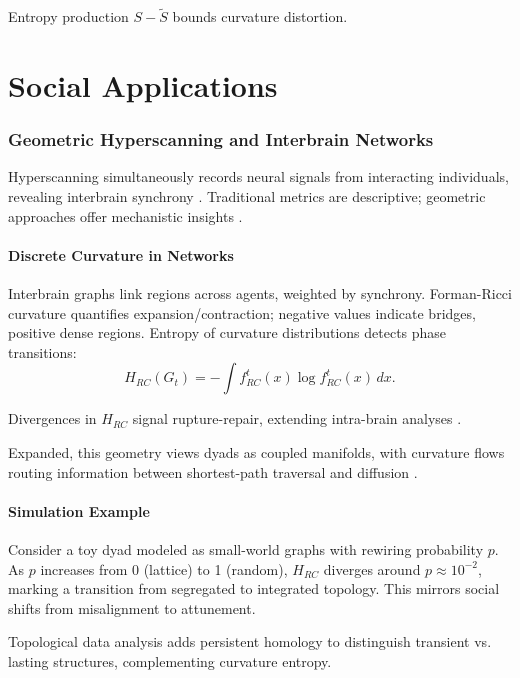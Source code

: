 \documentclass{article}
\theoremstyle{definition}
\begin{document}
Entropy production $S - \tilde{S}$ bounds curvature distortion.

\part{Social Applications}

\section{Geometric Hyperscanning and Interbrain Networks}

Hyperscanning simultaneously records neural signals from interacting individuals, revealing interbrain synchrony \cite{montague2002hyperscanning}. Traditional metrics are descriptive; geometric approaches offer mechanistic insights \cite{hinrichs2025geometry}.

\subsection{Discrete Curvature in Networks}

Interbrain graphs link regions across agents, weighted by synchrony. Forman-Ricci curvature quantifies expansion/contraction; negative values indicate bridges, positive dense regions. Entropy of curvature distributions detects phase transitions:
\[
H_{RC}(G_t) = -\int f^t_{RC}(x) \log f^t_{RC}(x) \, dx.
\]

Divergences in $H_{RC}$ signal rupture-repair, extending intra-brain analyses \cite{weber2019curvature,chatterjee2021detecting}.

Expanded, this geometry views dyads as coupled manifolds, with curvature flows routing information between shortest-path traversal and diffusion \cite{avena2019spectrum}.

\subsection{Simulation Example}

Consider a toy dyad modeled as small-world graphs with rewiring probability $p$. As $p$ increases from 0 (lattice) to 1 (random), $H_{RC}$ diverges around $p \approx 10^{-2}$, marking a transition from segregated to integrated topology. This mirrors social shifts from misalignment to attunement.

Topological data analysis adds persistent homology to distinguish transient vs. lasting structures, complementing curvature entropy.
\end{document}
